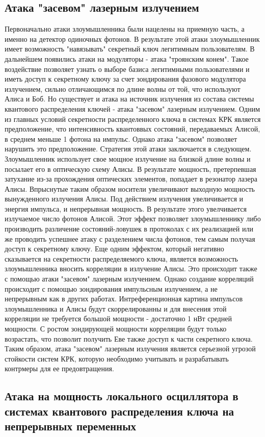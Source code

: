 \subsection{Атака "засевом" лазерным излучением}\label{sec:ch1/sect7/subsec1}
Первоначально атаки злоумышленника были нацелены на приемную часть, а именно на детектор одиночных фотонов. В результате этой атаки злоумышленник имеет возможность "навязывать" секретный ключ легитимным пользователям. 
В дальнейшем  появились атаки на модуляторы - атака "троянским конем". Такое воздействие позволяет узнать о выборе базиса легитимными пользователями и иметь доступ к секретному ключу за счет зондирования фазового модулятора излучением, сильно отличающимся по длине волны от той, что используют Алиса и Боб.
Но существует и атака на источник излучения из состава системы квантового распределения ключей - атака "засевом" лазерным излучением. Одним из главных условий секретности распределенного ключа в системах КРК является предположение, что интенсивность квантоввых состояний, передаваемых Алисой, в среднем меньше 1 фотона на импульс.
Однако атака "засевом" позволяет нарушить это предположение. Стратегия этой атаки заключается в следующем. Злоумышленник использует свое мощное излучение на близкой длине волны и посылает его в оптическую схему Алисы.
В результате мощность, претерпевшая затухание из-за прохождения оптических элементов, попадает в резонатор лазера Алисы. Впрыснутые таким образом носители увеличивают выходную мощность вынужденного излучения Алисы. 
Под действием излучения увеличивается и энергия импульса, и непрерывная мощность. В результате этого увелчивается излучаемое число фотонов Алисой. Этот эффект позволяет злоумышленнику либо производить различение состояний-ловушек в протоколах с их реализацией или же проводить успешнее атаку с разделением числа фотонов, тем самым получая доступ к секретному ключу. 
Еще одним эффектом, который негативно сказывается на секретности распределяемого ключа, является возможность злоумышленника вносить корреляции в излучение Алисы. Это происходит также с помощью атаки "засевом" лазерным излучением.
Однако создание корреляций происходит с помощью зондирования импульсным излучением, а не непрерывным как в других работах. Интреференционная картина импульсов злоумышленника и Алисы будут скоррелированны и для внесения этой корреляции не требуется большой мощности - достаточно 1 нВт средней мощности. 
С ростом зондирующей мощности корреляции будут только возрастать, что позволит получить Еве также доступ к части секретного ключа.
\newline Таким образом, атака "засевом" лазерным излучения является серьезной угрозой стойкости систем КРК, которую необходимо учитывать и разрабатывать контрмеры для ее предовтращения. 

\subsection{Атака на мощность локального осциллятора в системах квантового распределения ключа на непрерывных переменных}\label{sec:ch1/sect7/subsec2}

